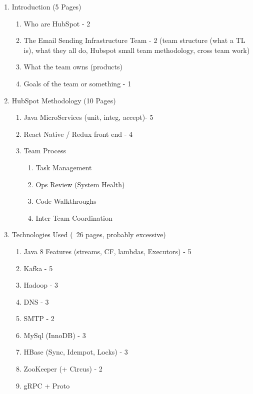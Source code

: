 

\begin{enumerate}
	\item Introduction (5 Pages)
	\begin{enumerate}
    	\item Who are HubSpot - 2
        \item The Email Sending Infrastructure Team - 2 (team structure (what a TL is), what they all do, Hubspot small team methodology, cross team work)
        \item What the team owns (products)
        \item Goals of the team or something - 1
    \end{enumerate}
    
    \item HubSpot Methodology (10 Pages)
    \begin{enumerate}
    	\item Java MicroServices (unit, integ, accept)- 5
        \item React Native / Redux front end - 4
        \item Team Process
        \begin{enumerate}
            \item Task Management
            \item Ops Review (System Health)
            \item Code Walkthroughs
            \item Inter Team Coordination
        \end{enumerate}	
    \end{enumerate}
    
	
    \item Technologies Used (~26 pages, probably excessive)
    \begin{enumerate}
    	\item Java 8 Features (streams, CF, lambdas, Executors) - 5
        \item Kafka - 5
        \item Hadoop - 3
        \item DNS - 3
        \item SMTP - 2
        \item MySql (InnoDB) - 3
        \item HBase (Sync, Idempot, Locks) - 3
        \item ZooKeeper (+ Circus) - 2
        \item gRPC + Proto
    \end{enumerate}    
    

\end{enumerate}
